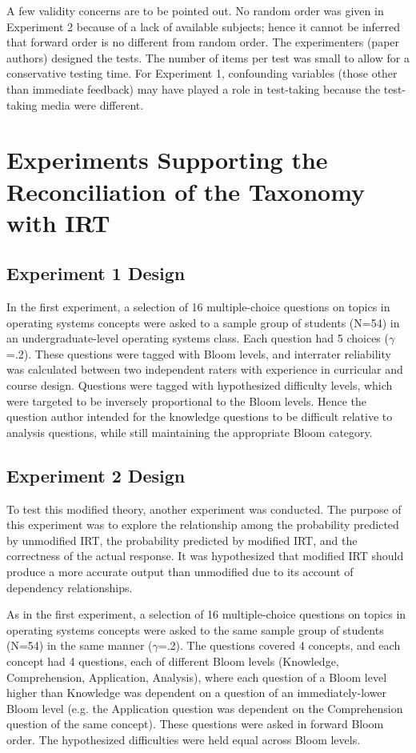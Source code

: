 A few validity concerns are to be pointed out. No random order was given in
Experiment 2 because of a lack of available subjects; hence it cannot be
inferred that forward order is no different from random order. The
experimenters (paper authors) designed the tests. The number of items per test
was small to allow for a conservative testing time.  For Experiment 1,
confounding variables (those other than immediate feedback) may have played a
role in test-taking because the test-taking media were different.


\section{Experiments Supporting the Reconciliation of the Taxonomy with IRT}

\subsection{Experiment 1 Design}

In the first experiment, a selection of 16 multiple-choice questions on topics
in operating systems concepts were asked to a sample group of students (N=54)
in an undergraduate-level operating systems class.  Each question had 5 choices
($\gamma$=.2). These questions were tagged with Bloom levels, and interrater
reliability was calculated between two independent raters with experience in
curricular and course design.  Questions were tagged with hypothesized
difficulty levels, which were targeted to be inversely proportional to the
Bloom levels.  Hence the question author intended for the knowledge questions
to be difficult relative to analysis questions, while still maintaining the
appropriate Bloom category.

\subsection{Experiment 2 Design}

To test this modified theory, another experiment was conducted.  The purpose of
this experiment was to explore the relationship among the probability predicted
by unmodified IRT, the probability predicted by modified IRT, and the
correctness of the actual response.  It was hypothesized that modified IRT
should produce a more accurate output than unmodified due to its account of
dependency relationships.

As in the first experiment, a selection of 16 multiple-choice questions on
topics in operating systems concepts were asked to the same sample group of
students (N=54) in the same manner ($\gamma$=.2).  The questions covered 4
concepts, and each concept had 4 questions, each of different Bloom levels
(Knowledge, Comprehension, Application, Analysis), where each question of a
Bloom level higher than Knowledge was dependent on a question of an
immediately-lower Bloom level (e.g. the Application question was dependent on
the Comprehension question of the same concept).  These questions were asked in
forward Bloom order.  The hypothesized difficulties were held equal across
Bloom levels.



